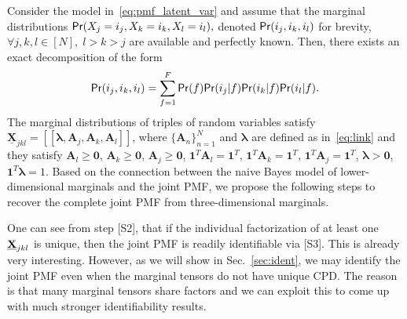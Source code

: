 \documentclass[journal]{IEEEtran}
\begin{document}
Consider the model in~\eqref{eq:pmf_latent_var} and assume that the marginal distributions  ${\sf Pr}(X_j=i_j,X_k=i_k,X_l=i_l) ,$ denoted ${\sf Pr}(i_j,i_k,i_l)$ for brevity, $\forall j,k,l \in [N],\; l>k>j$  are available and perfectly known. Then, there exists an exact decomposition of the form
\begin{equation}
{\sf Pr}(i_j,i_k,i_l) = \sum_{f=1}^{F}   {\sf Pr}(f) {\sf Pr}(i_j | f) {\sf Pr}(i_k | f) {\sf Pr}(i_l | f).
\end{equation}
The marginal distributions of triples of random variables satisfy $\underline{\mathbf{X}}_{jkl} = [\![ \boldsymbol{\lambda},\mathbf{A}_j,\mathbf{A}_k,\mathbf{A}_l ]\!]$, 
where $\{\mathbf{A}_n\}_{n=1}^N$ and ${\bm \lambda}$ are defined as in~\eqref{eq:link} and they satisfy $\mathbf{A}_l \geq \mathbf{0}$, $\mathbf{A}_k \geq \mathbf{0}$, $\mathbf{A}_j \geq \mathbf{0}$, $\mathbf{1}^T \mathbf{A}_l = \mathbf{1}^T$, $\mathbf{1}^T \mathbf{A}_k = \mathbf{1}^T$, $\mathbf{1}^T \mathbf{A}_j = \mathbf{1}^T$, $\boldsymbol{\lambda} > \mathbf{0} $, $\mathbf{1}^T \boldsymbol{\lambda} = 1$. 
Based on the connection between the naive Bayes model of { lower-dimensional} marginals and the joint PMF, we propose the following steps to recover the complete joint PMF from {three-dimensional} marginals.

\smallskip
\noindent
\fbox{
	\begin{minipage}{.95\linewidth}
		\textsf{\!\!\! \bf Procedure: Joint PMF Recovery From Triples}\\
		\; {\bf [S1]} Estimate $\underline{\bf X}_{jk\ell}$ from data;\\
		\; \!\!{\bf [S2]} Jointly factor $\underline{\mathbf{X}}_{jkl} = [\![ \boldsymbol{\lambda},\mathbf{A}_j,\mathbf{A}_k,\mathbf{A}_l ]\!]$ to estimate $\boldsymbol{\lambda},\mathbf{A}_j,\mathbf{A}_k,\mathbf{A}_l \; \forall$ $j,k,l$ using a CPD model with rank $F$;\\
		\; \!\!{\bf [S3]} Synthesize the joint PMF $\underline{\bf X}$ via ${\sf Pr}(i_1,i_2,\ldots,i_N) = \sum_{f=1}^F {\sf Pr}(f) \prod_{n=1}^N {\sf Pr}(i_n | f)$, w/  ${\sf Pr}(i_n | f)=\mathbf{A}_{n}(i_n,f)$, ${\sf Pr}(f) = \boldsymbol{\lambda}(f)$.
	\end{minipage}
}

\smallskip

One can see from step [S2], that if the individual factorization of at least one $\underline{\bf X}_{jkl}$ is unique, then the joint PMF is readily identifiable via [S3]. This is already very interesting. However, as we will show in Sec.~\ref{sec:ident}, we may identify the joint PMF even when the marginal tensors do not have unique {CPD}. The reason is that many marginal tensors share factors and we can exploit this to come up with much stronger identifiability results.
\end{document}
